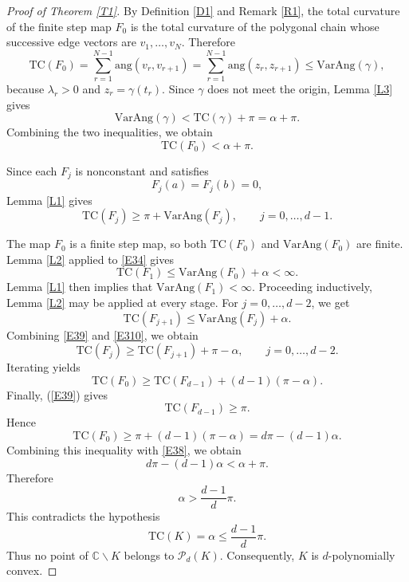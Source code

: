 \documentclass[reqno]{amsart}
\theoremstyle{definition}
\newcommand{\C}{\mathbb{C}}
\newcommand{\ang}{\mathrm{ang}}
\newcommand{\T}{\mathrm{TC}}
\newcommand{\VA}{\mathrm{VarAng}}
\newcommand{\cP}{\mathcal{P}}
\numberwithin{equation}{section}
\begin{document}
\begin{proof}[Proof of Theorem \ref{T1}]
By Definition \ref{D1} and Remark \ref{R1}, the total curvature of the finite step map $F_0$ is the total curvature of the polygonal chain whose successive edge vectors are $v_1,\ldots,v_N.$
Therefore
\begin{equation*}\T(F_0)=\sum_{r=1}^{N-1}\ang(v_r,v_{r+1})=\sum_{r=1}^{N-1}\ang(z_r,z_{r+1})\le\VA(\gamma),
\end{equation*}
because $\lambda_r>0$ and $z_r=\gamma(t_r)$. Since $\gamma$ does not meet the origin, Lemma \ref{L3} gives
\begin{equation*}\VA(\gamma)<\T(\gamma)+\pi=\alpha+\pi.    
\end{equation*}
Combining the two inequalities, we obtain
\begin{equation}\T(F_0)<\alpha+\pi.
    \label{E38}
\end{equation}

Since each $F_j$ is nonconstant and satisfies
\[F_j(a)=F_j(b)=0,\]
Lemma \ref{L1} gives
\begin{equation} \T(F_j)\ge \pi+\VA(F_j),\qquad j=0,\ldots,d-1.
    \label{E39}
\end{equation}

The map $F_0$ is a finite step map, so both $\T(F_0)$ and $\VA(F_0)$ are finite. Lemma \ref{L2} applied to \eqref{E34} gives
\[\T(F_1)\le\VA(F_0)+\alpha<\infty.\]
Lemma \ref{L1} then implies that $\VA(F_1)<\infty$. Proceeding inductively, Lemma \ref{L2} may be applied at every stage. For $j=0,\ldots,d-2$, we get
\begin{equation}\T(F_{j+1})\le\VA(F_j)+\alpha.
    \label{E310}
\end{equation}
Combining \eqref{E39} and
\eqref{E310}, we obtain
\begin{equation*} \T(F_j) \ge \T(F_{j+1})+\pi-\alpha,\qquad j=0,\ldots,d-2.
\end{equation*}
Iterating yields
\[\T(F_0)\ge \T(F_{d-1})+(d-1)(\pi-\alpha).
\]
Finally, (\ref{E39}) gives
\[\T(F_{d-1})\geq\pi.\]
Hence
\begin{equation*}
    \T(F_0)\ge \pi+(d-1)(\pi-\alpha)=d\pi-(d-1)\alpha.
   \end{equation*}
Combining this inequality with \eqref{E38}, we obtain
\[d\pi-(d-1)\alpha < \alpha+\pi.
\]
Therefore
\[\alpha>\frac{d-1}{d}\pi.
\]
This contradicts the hypothesis
\[\T(K)=\alpha\le\frac{d-1}{d}\pi.\]
Thus no point of $\C\backslash K$ belongs to $\cP_d(K)$. Consequently, $K$ is $d$-polynomially convex.
\end{proof}
\end{document}
